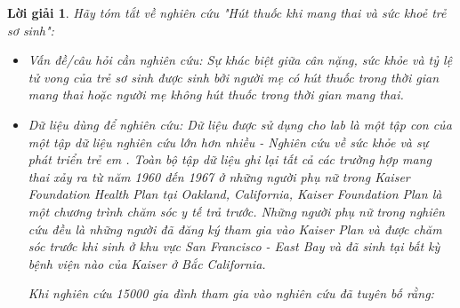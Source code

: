 \documentclass[14pt, a4paper]{article}
\theoremstyle{sltheorem}
\theoremstyle{soltheorem}
\newtheorem*{loigiai}{Lời giải}
\begin{document}
\begin{loigiai}
    Hãy tóm tắt về nghiên cứu "Hút thuốc khi mang thai và sức khoẻ trẻ sơ sinh":
    \begin{itemize}
        \item Vấn đề/câu hỏi cần nghiên cứu: Sự khác biệt giữa cân nặng, sức khỏe và tỷ lệ tử vong của trẻ sơ sinh được sinh bởi người mẹ có hút thuốc trong thời gian mang thai hoặc người mẹ không hút thuốc trong thời gian mang thai.
        \item Dữ liệu dùng để nghiên cứu:
        Dữ liệu được sử dụng cho lab là một tập con của một tập dữ liệu nghiên cứu lớn hơn nhiều - Nghiên cứu về sức khỏe và sự phát triển trẻ em \cite{yerushalmy1964mother}. 
        Toàn bộ tập dữ liệu ghi lại tất cả các trường hợp mang thai xảy ra từ năm 1960 đến 1967 ở những người phụ nữ trong Kaiser Foundation Health Plan  tại Oakland, California, Kaiser Foundation Plan là một chương trình chăm sóc y tế trả trước. 
        Những người phụ nữ trong nghiên cứu đều là những người đã đăng ký tham gia vào Kaiser Plan và được chăm sóc trước khi sinh ở khu vực San Francisco - East Bay và đã sinh tại bất kỳ bệnh viện nào của Kaiser ở Bắc California.

        Khi nghiên cứu 15000 gia đình tham gia vào nghiên cứu \cite{yerushalmy1964mother} đã tuyên bố rằng:


\end{itemize}
\end{loigiai}
\end{document}
